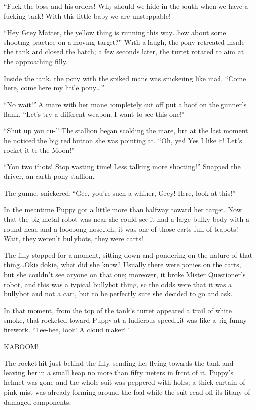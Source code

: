 ``Fuck the boss and his orders! Why should we hide in the south when we have a fucking tank! With this little baby we are unstoppable!

``Hey Grey Matter, the yellow thing is running this way\dots how about some shooting practice on a moving target?'' With a laugh, the pony retreated inside the tank and closed the hatch; a few seconds later, the turret rotated to aim at the approaching filly.

Inside the tank, the pony with the spiked mane was snickering like mad. ``Come here, come here my little pony\dots''

``No wait!'' A mare with her mane completely cut off put a hoof on the gunner's flank. ``Let's try a different weapon, I want to see this one!''

``Shut up you cu-'' The stallion began scolding the mare, but at the last moment he noticed the big red button she was pointing at. ``Oh, yes! Yes I like it! Let's rocket it to the Moon!''

``You two idiots! Stop wasting time! Less talking more shooting!'' Snapped the driver, an earth pony stallion.

The gunner snickered. ``Gee, you're such a whiner, Grey! Here, look at this!''

In the meantime Puppy got a little more than halfway toward her target. Now that the big metal robot was near she could see it had a large bulky body with a round head and a looooong nose\dots oh, it was one of those carts full of teapots! Wait, they weren't bullybots, they were carts!

The filly stopped for a moment, sitting down and pondering on the nature of that thing\dots Okie dokie, what did she know? Usually there were ponies on the carts, but she couldn't see anyone on that one; moreover, it broke Mister Questioner's robot, and this was a typical bullybot thing, so the odds were that it was a bullybot and not a cart, but to be perfectly sure she decided to go and ask.

In that moment, from the top of the tank's turret appeared a trail of white smoke, that rocketed toward Puppy at a ludicrous speed\dots it was like a big funny firework. ``Tee-hee, look! A cloud maker!''

KABOOM!

The rocket hit just behind the filly, sending her flying towards the tank and leaving her in a small heap no more than fifty meters in front of it. Puppy's helmet was gone and the whole suit was peppered with holes; a thick curtain of pink mist was already forming around the foal while the suit read off its litany of damaged components.

